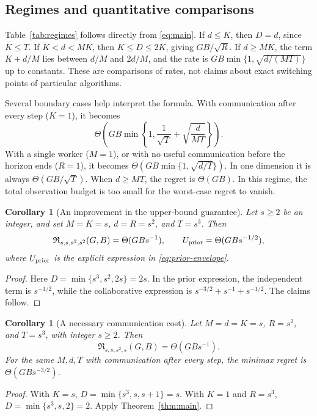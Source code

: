 \documentclass[11pt,a4paper]{article}
\numberwithin{equation}{section}
\newtheorem{corollary}[theorem]{Corollary}
\theoremstyle{remark}
\newcommand{\calR}{\mathfrak R}
\begin{document}
\subsection{Regimes and quantitative comparisons}

Table~\ref{tab:regimes} follows directly from \eqref{eq:main}. If
$d\le K$, then $D=d$, since $K\le T$. If $K<d<MK$, then
$K\le D\le2K$, giving $GB/\sqrt R$. If $d\ge MK$, the term
$K+d/M$ lies between $d/M$ and $2d/M$, and the rate is
$GB\min\{1,\sqrt{d/(MT)}\}$ up to constants. These are comparisons
of rates, not claims about exact switching points of particular
algorithms.

Several boundary cases help interpret the formula. With communication
after every step ($K=1$), it becomes
\begin{equation}
 \Theta\!\left(GB\min\left\{1,\frac1{\sqrt T}
                                  +\sqrt{\frac d{MT}}\right\}\right).
 \label{eq:sync}
\end{equation}
With a single worker ($M=1$), or with no useful communication before
the horizon ends ($R=1$), it becomes
$\Theta(GB\min\{1,\sqrt{d/T}\})$. In one dimension it is always
$\Theta(GB/\sqrt T)$. When $d\ge MT$, the regret is
$\Theta(GB)$. In this regime, the total observation budget is too small
for the worst-case regret to vanish.

\begin{corollary}[An improvement in the upper-bound guarantee]
\label{cor:improvement}
Let $s\ge2$ be an integer, and set $M=K=s$, $d=R=s^2$, and
$T=s^3$. Then
\[
 \calR_{s,s,s^2,s^2}(G,B)=\Theta(GBs^{-1}),
 \qquad U_{\rm prior}=\Theta(GBs^{-1/2}),
\]
where $U_{\rm prior}$ is the explicit expression in
\eqref{eq:prior-envelope}.
\end{corollary}
\begin{proof}
Here $D=\min\{s^3,s^2,2s\}=2s$. In the prior expression, the
independent term is $s^{-1/2}$, while the collaborative expression is
$s^{-3/2}+s^{-1}+s^{-1/2}$. The claims follow.
\end{proof}

\begin{corollary}[A necessary communication cost]
\label{cor:witness}
Let $M=d=K=s$, $R=s^2$, and $T=s^3$, with integer $s\ge2$. Then
\[
 \calR_{s,s,s^2,s}(G,B)=\Theta(GBs^{-1}).
\]
For the same $M,d,T$ with communication after every step, the minimax
regret is $\Theta(GBs^{-3/2})$.
\end{corollary}
\begin{proof}
With $K=s$, $D=\min\{s^3,s,s+1\}=s$. With $K=1$ and
$R=s^3$, $D=\min\{s^3,s,2\}=2$. Apply Theorem~\ref{thm:main}.
\end{proof}
\end{document}

